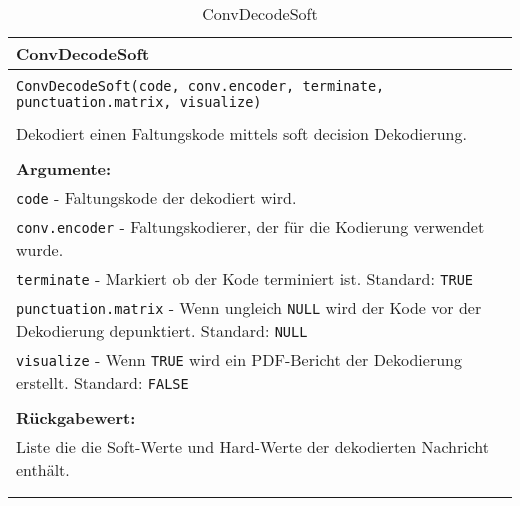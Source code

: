 \begin{longtable}{|p{\textwidth}|}
\hline
\rowcolor{lightblue}
ConvDecodeSoft
\\
\hline
\\
\texttt{ConvDecodeSoft(code, conv.encoder, terminate, punctuation.matrix, visualize)}\\
\\
Dekodiert einen Faltungskode mittels soft decision Dekodierung.\\
\\
\textbf{Argumente:}\\
\texttt{code} - Faltungskode der dekodiert wird.\\
\texttt{conv.encoder} - Faltungskodierer, der für die Kodierung verwendet wurde.\\
\texttt{terminate} - Markiert ob der Kode terminiert ist. Standard: \texttt{TRUE}\\
\texttt{punctuation.matrix} - Wenn ungleich \texttt{NULL} wird der Kode vor der Dekodierung depunktiert. Standard: \texttt{NULL}\\
\texttt{visualize} - Wenn \texttt{TRUE} wird ein PDF-Bericht der Dekodierung erstellt. Standard: \texttt{FALSE}\\
\\
\textbf{Rückgabewert:}\\
Liste die die Soft-Werte und Hard-Werte der dekodierten Nachricht enthält.\\
\\
\hline
\caption{ConvDecodeSoft}
\label{funktion:ConvDecodeSoft}
\end{longtable}